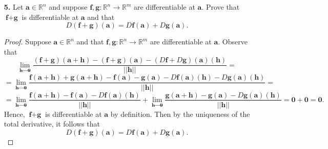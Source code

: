 \documentclass[ 12pt ]{article}
\begin{document}
\begin{enumerate}
\begin{proof}
			Conversely, suppose that every sequence $\textbf{x}_k \in A$ which converges to a point in $E$ satisfies $\lim_{k \to \infty} \textbf{x}_k \in A$. In the case
			that $A = \varnothing$, then $A$ is closed by Remark 8.23 and so $A$ is relatively closed in $E$. Otherwise, let $A \neq \varnothing$. I claim that $A = E \cap
			\overline{A}$. Since $A \subseteq E$ and $A \subseteq \overline{A}$ by Theorem 8.32i, it must hold that $A \subseteq E \cap \overline{A}$. To show that $A
			\supseteq E \cap \overline{A}$, consider an arbitrary point $\textbf{a} \in E \cap \overline{A}$. Observe that $\textbf{a}$ must belong to $E$ and $\textbf{a}$
			must also be a limit point of $A$ by our lemma. Thus, $\textbf{a} \in A$ by our initial assumption of $A$. Therefore, $A = E \cap \overline{A}$ and so $A$ is
			relatively closed in $E$ by definition.
		\end{proof}


	\item[\textbf{5.}] Let $\textbf{a} \in \mathbb{R}^n$ and suppose $\textbf{f}, \textbf{g} : \mathbb{R}^n \to \mathbb{R}^m$ are differentiable at $\textbf{a}$. Prove that
		$\textbf{f} + \textbf{g}$ is differentiable at $\textbf{a}$ and that $$D(\textbf{f} + \textbf{g})(\textbf{a}) = D\textbf{f}(\textbf{a}) + D\textbf{g}(\textbf{a}).$$

		\begin{proof}
			Suppose $\textbf{a} \in \mathbb{R}^n$ and that $\textbf{f}, \textbf{g} : \mathbb{R}^n \to \mathbb{R}^m$ are differentiable at $\textbf{a}$. Observe that
			$$\lim_{\textbf{h} \to \textbf{0}} \frac{(\textbf{f} + \textbf{g})(\textbf{a} + \textbf{h}) - (\textbf{f} + \textbf{g})(\textbf{a}) - (D\textbf{f} +
			D\textbf{g})(\textbf{a})(\textbf{h})}{||\textbf{h}||} =$$
			$$=\lim_{\textbf{h} \to \textbf{0}} \frac{\textbf{f}(\textbf{a} + \textbf{h}) + \textbf{g}(\textbf{a} + \textbf{h}) - \textbf{f}(\textbf{a}) -
			\textbf{g}(\textbf{a}) - D\textbf{f}(\textbf{a})(\textbf{h}) - D\textbf{g}(\textbf{a})(\textbf{h})}{||\textbf{h}||} =$$
			$$= \lim_{\textbf{h} \to \textbf{0}} \frac{\textbf{f}(\textbf{a} + \textbf{h}) - \textbf{f}(\textbf{a}) - D\textbf{f}(\textbf{a})(\textbf{h})}{||\textbf{h}||} +
			\lim_{\textbf{h} \to \textbf{0}} \frac{\textbf{g}(\textbf{a} + \textbf{h}) - \textbf{g}(\textbf{a}) - D\textbf{g}(\textbf{a})(\textbf{h})}{||\textbf{h}||} = \textbf{0} +
			\textbf{0} = \textbf{0}.$$ Hence, $\textbf{f} + \textbf{g}$ is differentiable at $\textbf{a}$ by definition. Then by the uniqueness of the total derivative,
			it follows that $$D(\textbf{f} + \textbf{g})(\textbf{a}) = D\textbf{f}(\textbf{a}) + D\textbf{g}(\textbf{a}).$$
		\end{proof}
		\newpage



\end{enumerate}
\end{document}
